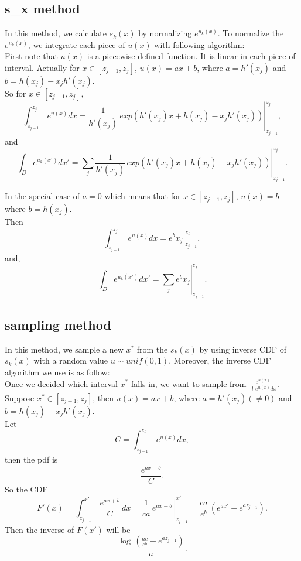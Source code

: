 \documentclass[11pt, oneside]{article}   	%
\begin{document}
\subsection*{ s\_x method }
In this method, we calculate $s_{k}(x)$ by normalizing $e^{ u_{k}(x)}$. To normalize the $e^{ u_{k}(x)}$, we integrate each piece of $u(x)$ with following algorithm: \\
First note that $u(x)$ is a piecewise defined function. It is linear in each piece of interval. Actually for $x \in [z_{j-1}, z_j]$, $u(x) = ax+b $, where $a=h'(x_j)$ and $b=h(x_j)- x_j h'(x_j)$. \\
So for $x \in [z_{j-1}, z_j]$, 
\begin{displaymath}
\int_{z_{j-1}}^{z_j} \, e^{u(x)} dx =\left. \frac{1}{h'(x_j)} \, exp( h'(x_j)x + h(x_j) -x_j h'(x_j))  \right|_{z_{j-1}}^{z_j},
\end{displaymath}
and
\begin{displaymath}
\int_D e^{u_k(x')} dx' = \left.\sum_j \frac{1}{h'(x_j)} \,exp( h'(x_j)x + h(x_j) -x_j h'(x_j))  \right|_{z_{j-1}}^{z_j}.
\end{displaymath}

In the special case of $a=0$ which means that for $x \in [z_{j-1}, z_j]$, $u(x) = b $ where $b=h(x_j)$. \\Then
\begin{displaymath}
 \int_{z_{j-1}}^{z_j} \, e^{u(x)} dx =\left. e^bx_j\right|_{z_{j-1}}^{z_j} , 
\end{displaymath}
and, 
\begin{displaymath}
\int_D e^{u_k(x')} dx' =\left.\sum_j  e^bx_j\right|_{z_{j-1}}^{z_j}.
\end{displaymath}


\subsection*{ sampling method }
In this method, we sample a new $x^{*}$ from the $s_{k}(x)$ by using inverse CDF of  $s_{k}(x)$ with a random value $u \sim unif(0,1)$. Moreover, the inverse CDF algorithm we use is as follow: \\
Once we decided which interval $x^*$ falls in, we want to sample from $\frac{e^{u(x)}} {\int e^{u(x)} dx}$. Suppose $x^* \in [z_{j-1}, z_j]$, then $u(x) = ax+b $, where $a=h'(x_j)(\neq0)$ and $b=h(x_j)- x_j h'(x_j)$. \\
Let
\begin{displaymath}
C=\int_{z_{j-1}}^{z_j} \, e^{u(x)} dx,
\end{displaymath}
then the pdf is
\begin{displaymath}
\frac{e^{ax+b}}{C}.
\end{displaymath}
So the CDF
\begin{displaymath}
F'(x)=\int_{z_{j-1}}^{x'} \,  \frac{e^{ax+b}}{C} \, dx = \left. \frac{1}{ca}\, e^{ax+b} \, \right|_{z_{j-1}}^{x'} = \frac{ca}{e^b}\,(e^{ax'}-e^{az_{j-1}}).
\end{displaymath}
Then the inverse of $F(x')$ will be
\begin{displaymath}
\frac{\log\,(\frac{ac}{e^b}+e^{az_{j-1}})}{a}.
\end{displaymath}
\end{document}
